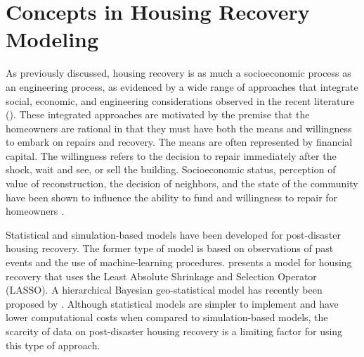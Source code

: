 \section{Concepts in Housing Recovery Modeling} 
As previously discussed, housing recovery is as much a socioeconomic process as an engineering process, as evidenced by a wide range of approaches that integrate social, economic, and engineering considerations observed in the recent literature (\cite{nejat2020spatially, moradi2020recovus, costa2020housing, bilau2018practice, hamideh2018housing, Burton2018, DESaster}). These integrated approaches are motivated by the premise that the homeowners are rational in that they must have both the means and willingness to embark on repairs and recovery. The means are often represented by financial capital. The willingness refers to the decision to repair immediately after the shock, wait and see, or sell the building. Socioeconomic status, perception of value of reconstruction, the decision of neighbors, and the state of the community have been shown to influence the ability to fund and willingness to repair for homeowners \citep{Burton2018, moradi2020recovus, nejat2012agent, comerio2006estimating, chang2011identifying, boiser2011skills, bilau2015framework, hwang2015postdisaster, bothara2016challenges}. \ 

Statistical and simulation-based models have been developed for post-disaster housing recovery. The former type of model is based on observations of past events and the use of machine-learning procedures. \citet{nejat2012agent} presents a model for housing recovery that uses the Least Absolute Shrinkage and Selection Operator (LASSO). A hierarchical Bayesian geo-statistical model has recently been proposed by \citet{nejat2020spatially}. Although statistical models are simpler to implement and have lower computational costs when compared to simulation-based models, the scarcity of data on post-disaster housing recovery is a limiting factor for using this type of approach.\ 

